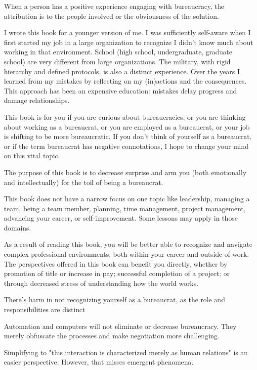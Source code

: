 When a person has a positive experience engaging with bureaucracy, the attribution is to the people involved or the obviousness of the solution. 

I wrote this book for a younger version of me. I was sufficiently self-aware when I first started my job in a large organization to recognize I didn't know much about working in that environment. School (high school, undergraduate, graduate school) are very different from large organizations. The military, with rigid hierarchy and defined protocols, is also a distinct experience. Over the years I learned from my mistakes by reflecting on my (in)actions and the consequences. This approach has been an expensive education: mistakes delay progress and damage relationships.

This book is for you if you are curious about bureaucracies, or you are thinking about working as a bureaucrat, or you are employed as a bureaucrat, or your job is shifting to be more bureaucratic. If you don't think of yourself as a bureaucrat, or if the term bureaucrat has negative connotations, I hope to change your mind on this vital topic. 


The purpose of this book is to decrease surprise and arm you (both emotionally and intellectually) for the toil of being a bureaucrat. 

This book does not have a narrow focus on one topic like leadership, managing a team, being a team member, planning, time management, project management, advancing your career, or self-improvement. Some lessons may apply in those domains.

As a result of reading this book, you will be better able to recognize and navigate complex professional environments, both within your career and outside of work. The perspectives offered in this book can benefit you directly, whether by promotion of title or increase in pay; successful completion of a project; or through decreased stress of understanding how the world works.

There's harm in not recognizing yourself as a bureaucrat, as the role and responsibilities are distinct

Automation and computers will not eliminate or decrease bureaucracy. They merely obfuscate the processes and make negotiation more challenging. 

Simplifying to "this interaction is characterized merely as human relations" is an easier perspective. However, that misses emergent phenomena. 

